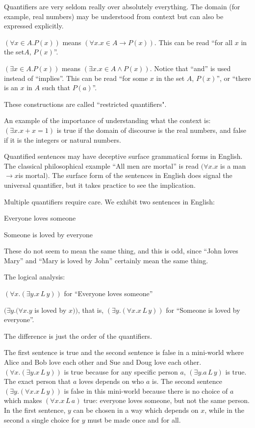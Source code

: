 \documentclass[12pt]{article}
\begin{document}
Quantifiers are very seldom really over absolutely everything.  The domain
(for example, real numbers) may be understood from context but can also
be expressed explicitly.

$(\forall x \in A.P(x))$ means $(\forall x.x \in A \rightarrow P(x))$.
This can be read ``for all $x$ in the set$A$, $P(x)$''.

$(\exists x \in A.P(x))$ means $(\exists x.x \in A \wedge P(x))$.  Notice that
``and'' is used instead of ``implies''.   This can be read ``for some $x$ in the set $A$, $P(x)$'', or ``there is an $x$ in $A$ such that $P(a)$''.

These constructions are called ``restricted quantifiers".

An example of the importance of understanding what the context is:
$(\exists x.x+x=1)$ is true if the domain of discourse is the real
numbers, and false if it is the integers or natural numbers.

Quantified sentences may have deceptive surface grammatical forms in
English.  The classical philosophical example ``All men are mortal''
is read $(\forall x.x$ is a man$\rightarrow x$is mortal$)$.  The
surface form of the sentences in English does signal the universal
quantifier, but it takes practice to see the implication.

Multiple quantifiers require care.  We exhibit two sentences in English:

Everyone loves someone

Someone is loved by everyone

These do not seem to mean the same thing, and this is odd, since
``John loves Mary'' and ``Mary is loved by John'' certainly mean the
same thing.

The logical analysis:

$(\forall x.(\exists y.x\,L\,y))$ for ``Everyone loves someone''

$(\exists y.(\forall x.y$ is loved by $x))$, that is, $(\exists
y.(\forall x.x\,L\,y))$ for ``Someone is loved by everyone''.

The difference is just the order of the quantifiers.

The first sentence is true and the second sentence is false in a
mini-world where Alice and Bob love each other and Sue and Doug love
each other.  $(\forall x.(\exists y.x\,L\,y))$ is true because for any
specific person $a$, $(\exists y.a\,L\,y)$ is true.  The exact person
that $a$ loves depends on who $a$ is.  The second sentence $(\exists
y.(\forall x.x\,L\,y))$ is false in this mini-world because there is
no choice of $a$ which makes $(\forall x.x\,L\,a)$ true: everyone
loves someone, but not the same person.  In the first sentence, $y$ can
be chosen in a way which depends on $x$, while in the second a single choice
for $y$ must be made once and for all.
\end{document}
